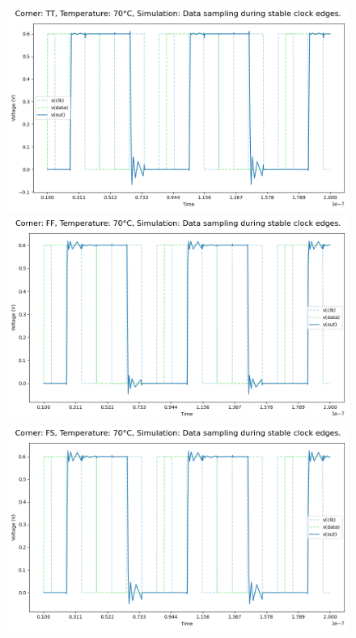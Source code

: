 \begin{figure}[H]
    \centering
    \includegraphics[height= 0.21\textheight]{figures/aimspice/0.600_0.1u_0.1u_0.3u_0.1u/functionality/TT70W2.png}
    \vspace{5pt}
    \includegraphics[height= 0.21\textheight]{figures/aimspice/0.600_0.1u_0.1u_0.3u_0.1u/functionality/FF70W2.png}
    \vspace{5pt}
    \includegraphics[height= 0.21\textheight]{figures/aimspice/0.600_0.1u_0.1u_0.3u_0.1u/functionality/FS70W2.png}

\end{figure}
